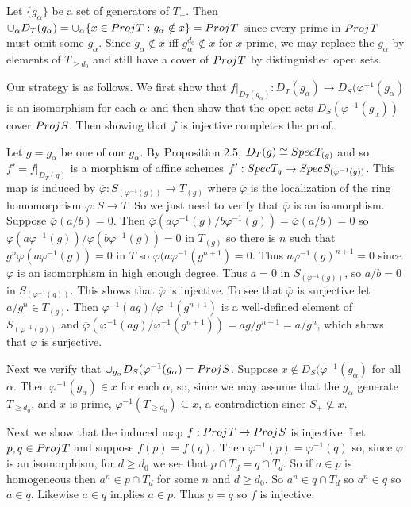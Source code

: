 \documentclass[12pt]{article}
\newcommand{\ov}{\overline{\varphi}}
\renewcommand{\phi}{\varphi}
\newcommand{\proj}{Proj \hspace{.01in}}
\newcommand{\spec}{Spec \hspace{.01in}}
\begin{document}
Let $\{g_{\alpha}\}$ be a set of generators of $T_{+}$. Then
$\cup_{\alpha}D_T(g_{\alpha})=
\cup_{\alpha}\{x\in\proj T : g_{\alpha} \notin x\}=\proj T$
since every prime in $\proj T$ must omit some $g_\alpha$. 
Since $g_{\alpha}\notin{}x$ iff $g_{\alpha}^{d_0}\notin{}x$ for
$x$ prime, we may replace the $g_{\alpha}$ by elements of
$T_{\geq d_0}$ and still have a cover of $\proj T$ by distinguished
open sets. 

Our strategy is as follows. We first show that 
$f|_{D_T(g_{\alpha})}:D_T(g_{\alpha})\rightarrow{}D_S(\varphi^{-1}
(g_{\alpha})$ is an isomorphism for each $\alpha$ and then show that 
the open sets $D_S(\varphi^{-1}(g_{\alpha}))$ cover $\proj S$. 
Then showing that $f$ is injective completes the proof.

Let $g=g_{\alpha}$ be one of our $g_{\alpha}$. 
By Proposition 2.5, $D_T(g)\cong\spec T_{(g)}$
and so $f'=f|_{D_T(g)}$ is a morphism of affine schemes
$f':\spec T_g\rightarrow\spec S_{(\varphi^{-1}(g))}$.
This map is induced by $\ov:S_{(\varphi^{-1}(g))}
\rightarrow{}T_{(g)}$ where $\ov$ is 
the localization of the ring homomorphism
$\varphi:S\rightarrow T$.
So we just need to verify that $\ov$ is an isomorphism.
Suppose $\ov(a/b)=0$. Then $\ov(a\phi^{-1}(g)/b\phi^{-1}(g))=\ov(a/b)=0$
so $\phi(a\phi^{-1}(g))/\phi(b\phi^{-1}(g))=0$ in $T_{(g)}$ so
there is $n$ such that $g^n\phi(a\phi^{-1}(g))=0$ in $T$ so
$\phi(a\phi^{-1}(g^{n+1})=0$. Thus $a\phi^{-1}(g)^{n+1}=0$ since
$\phi$ is an isomorphism in high enough degree. Thus 
$a=0$ in $S_{(\phi^{-1}(g))}$, so $a/b=0$ in $S_{(\phi^{-1}(g))}$.
This shows that $\ov$ is injective. To see that $\ov$ is surjective
let $a/g^n\in T_{(g)}$. Then $\phi^{-1}(ag)/\phi^{-1}(g^{n+1})$ is
a well-defined element of $S_{(\phi^{-1}(g))}$ and
$\ov(\phi^{-1}(ag)/\phi^{-1}(g^{n+1}))=ag/g^{n+1}=a/g^n$, 
which shows that $\ov$ is surjective.  

Next we verify that $\cup_{g_{\alpha}}D_S(\phi^{-1}(g_{\alpha})=\proj S$. 
Suppose $x\notin D_S(\phi^{-1}(g_{\alpha})$ for all $\alpha$. Then
$\phi^{-1}(g_{\alpha})\in x$ for each $\alpha$, so, since we may assume
that the $g_{\alpha}$ generate $T_{\geq d_0}$, and $x$ is prime, 
$\phi^{-1}(T_{\geq d_0}) \subseteq x$, a contradiction since 
$S_{+}\not\subseteq x$.  

Next we show that the induced map $f:\proj T \rightarrow \proj S$
is injective. Let $p, q \in \proj T$ and suppose $f(p)=f(q)$. 
Then $\varphi^{-1}(p)=\varphi^{-1}(q)$ so, since $\varphi$ is an
isomorphism, for $d\geq d_0$ we see that $p\cap T_d=q\cap T_d$.
So if $a\in p$ is homogeneous then $a^n \in p\cap T_d$ for
some $n$ and $d\geq d_0$. So $a^n\in q\cap T_d$ so $a^n\in q$
so $a\in q$. Likewise $a\in q$ implies $a\in p$. Thus
$p=q$ so $f$ is injective. 
\end{document}
